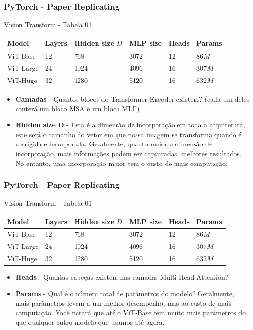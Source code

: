 \documentclass{beamer}
\begin{document}
\begin{frame}
	\frametitle{PyTorch - Paper Replicating}
	\begin{block}{Vision Transform - Tabela 01}
		\begin{table}[!ht]
			\centering
			\begin{tabular}{|l|l|l|l|l|l|}
				\hline
				Model & Layers & Hidden size $D$ & MLP size & Heads & Params \\ \hline
				ViT-Base & 12 & 768 & 3072 & 12 & $86M$ \\ \hline
				ViT-Large & 24 & 1024 & 4096 & 16 & $307M$ \\ \hline
				ViT-Huge & 32 & 1280 & 5120 & 16 & $632M$ \\ \hline
			\end{tabular}
		\end{table}
		\begin{itemize}
			\item \textbf{Camadas} - Quantos blocos do Transformer Encoder existem? (cada um deles conterá um bloco MSA e um bloco MLP)
			\item \textbf{Hidden size  D } - Esta é a dimensão de incorporação em toda a arquitetura, este será o tamanho do vetor em que nossa imagem se transforma quando é corrigida e incorporada. Geralmente, quanto maior a dimensão de incorporação, mais informações podem ser capturadas, melhores resultados. No entanto, uma incorporação maior tem o custo de mais computação.
		\end{itemize}
	\end{block}
\end{frame}
\begin{frame}
	\frametitle{PyTorch - Paper Replicating}
	\begin{block}{Vision Transform - Tabela 01}
		\begin{table}[!ht]
			\centering
			\begin{tabular}{|l|l|l|l|l|l|}
				\hline
				Model & Layers & Hidden size $D$ & MLP size & Heads & Params \\ \hline
				ViT-Base & 12 & 768 & 3072 & 12 & $86M$ \\ \hline
				ViT-Large & 24 & 1024 & 4096 & 16 & $307M$ \\ \hline
				ViT-Huge & 32 & 1280 & 5120 & 16 & $632M$ \\ \hline
			\end{tabular}
		\end{table}
		\begin{itemize}
			\item \textbf{Heads} - Quantas cabeças existem nas camadas Multi-Head Attention?
			\item \textbf{Params} - Qual é o número total de parâmetros do modelo? Geralmente, mais parâmetros levam a um melhor desempenho, mas ao custo de mais computação. Você notará que até o ViT-Base tem muito mais parâmetros do que qualquer outro modelo que usamos até agora.
		\end{itemize}
	\end{block}
\end{frame}
\end{document}
